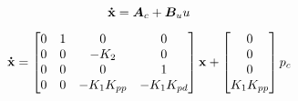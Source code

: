 \begin{equation}
	\mathbf{\dot{x}} = \bm{A}_{c} + \bm{B}_{u} u \\
\end{equation}

\begin{equation}
	\mathbf{\dot{x}} =
	\begin{bmatrix}
		0 & 1 & 0 				& 0 \\
		0 & 0 & -K_{2} 			& 0 \\
		0 & 0 & 0 				& 1 \\
		0 & 0 & -K_{1}K_{pp}	& -K_{1}K_{pd}
	\end{bmatrix}
	\mathbf{x} +
	\begin{bmatrix}
		0 \\ 0 \\ 0 \\ K_{1}K_{pp}
	\end{bmatrix}
	p_{c}
\end{equation}